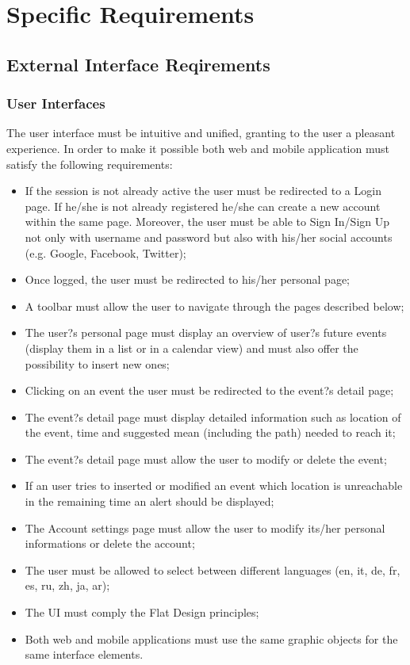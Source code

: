 \documentclass{article}
\begin{document}
	
	\section{Specific Requirements}
	
	
	\subsection{External Interface Reqirements}
	
	
	\subsubsection{User Interfaces}
	The user interface must be intuitive and unified, granting to the user a pleasant experience. In order to make it possible both web and mobile application must satisfy the following requirements:
	\begin{itemize}
	\item If the session is not already active the user must be redirected to a Login page. If he/she is not already registered he/she can create a new account within the same page. Moreover, the user must be able to Sign In/Sign Up not only with username and password but also with his/her social accounts (e.g. Google, Facebook, Twitter);
	\item Once logged, the user must be redirected to his/her personal page;
	\item A toolbar must allow the user to navigate through the pages described below;
	\item The user?s personal page must display an overview of user?s future events (display them in a list or in a calendar view) and must also offer the possibility to insert new ones;
	\item Clicking on an event the user must be redirected to the event?s detail page;
	\item The event?s detail page must display detailed information such as location of the event, time and suggested mean (including the path)  needed to reach it;
	\item The event?s detail page must allow the user to modify or delete the event;
	\item If an user tries to inserted or modified an event which location is unreachable in the remaining time an alert should be displayed;
	\item The Account settings page must allow the user to modify its/her personal informations or delete the account;
	\item The user must be allowed to select between different languages (en, it, de, fr, es, ru, zh, ja, ar);
	\item The UI must comply the Flat Design principles;
	\item Both web and mobile applications must use the same graphic objects for the same interface elements.
	\end{itemize}
	
\end{document}

